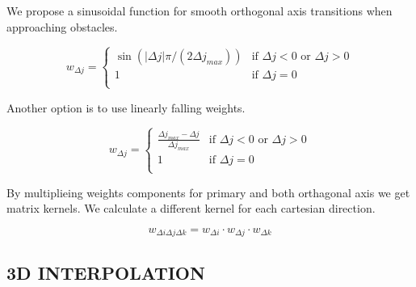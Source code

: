 \documentclass[letterpaper, 10 pt, conference]{ieeeconf}  %
\begin{document}
%

We propose a sinusoidal function for smooth orthogonal axis transitions when approaching obstacles.

\begin{equation}
	w_{\Delta j} =
	\begin{cases} 
		\sin(\left| \Delta j \right| \pi / (2 \Delta j_{max})) & \text{if } \Delta j < 0 \text{~or }  \Delta j > 0 \\
		1 & \text{if } \Delta j = 0 \\
	\end{cases}
\end{equation}

Another option is to use linearly falling weights.

\begin{equation}
	w_{\Delta j} =
	\begin{cases} 
		\frac{\Delta j_{max} - \Delta j }{\Delta j_{max}} & \text{if } \Delta j < 0 \text{~or }  \Delta j > 0 \\
		1 & \text{if } \Delta j = 0 \\
	\end{cases}
\end{equation}


By multiplieing weights components for primary and both orthagonal axis we get matrix kernels. We calculate a different kernel for each cartesian direction.

\begin{equation}
	w_{\Delta i \Delta j \Delta k} = w_{\Delta i} \cdot w_{\Delta j} \cdot w_{\Delta k}
\end{equation}

\subsection{3D INTERPOLATION} 
\end{document}
